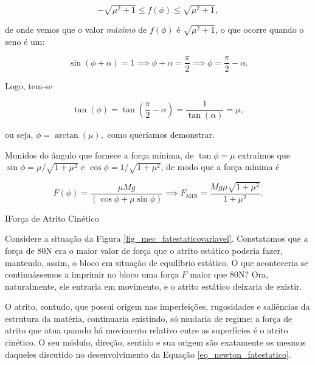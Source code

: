 \begin{exemplo}
$$ - \sqrt {\mu^2 +1} \leq f(\phi) \leq \sqrt {\mu^2 +1},$$

\noindent de onde vemos que o valor \emph{máximo} de $f(\phi)$ é $\sqrt {\mu^2 +1}$, o que ocorre quando o seno é um:

$$ \sin (\phi + \alpha) = 1 \implies \phi + \alpha = \dfrac{\pi}{2} \implies \phi = \dfrac{\pi}{2} - \alpha.$$

Logo, tem-se

$$ \tan (\phi) = \tan \left(\dfrac{\pi}{2} - \alpha \right) = \dfrac{1}{\tan (\alpha)} = \mu, $$

\noindent ou seja, $\phi = \arctan (\mu),$ como queríamos demonstrar.

Munidos do ângulo que fornece a força mínima, de $\tan \phi = \mu$ extraímos que $\sin \phi = \mu/\sqrt{1+\mu^2}$ e $\cos \phi = 1/\sqrt{1+\mu^2}$, de modo que a força mínima é


$$F (\phi)= \dfrac{\mu Mg}{(\cos \phi + \mu \sin \phi)} \implies \boxed{F_\text{MIN} = \dfrac{ Mg \mu\sqrt{1+\mu^2}}{1+\mu^2}.}$$


\end{exemplo}








\begin{secnivel}{I}{Força de Atrito Cinético}
  

\end{secnivel}







Considere a situação da Figura \ref{fig_mec_fatestaticovariavel}. Constatamos que a força de $80$N era o maior valor de força que o atrito estático poderia fazer, mantendo, assim, o bloco em situação de equilíbrio estático. O que aconteceria se continuássemos a imprimir no bloco uma força $F$ maior que $80$N? Ora, naturalmente, ele entraria em movimento, e o atrito estático deixaria de existir.



O atrito, contudo, que possui origem nas imperfeições, rugosidades e saliências da estrutura da matéria, continuaria existindo, só mudaria de regime: a força de atrito que atua quando há movimento relativo entre as superfícies é o atrito cinético. O seu módulo, direção, sentido e sua origem são exatamente os mesmos daqueles discutido no desenvolvimento da Equação \eqref{eq_newton_fatestatico}.

